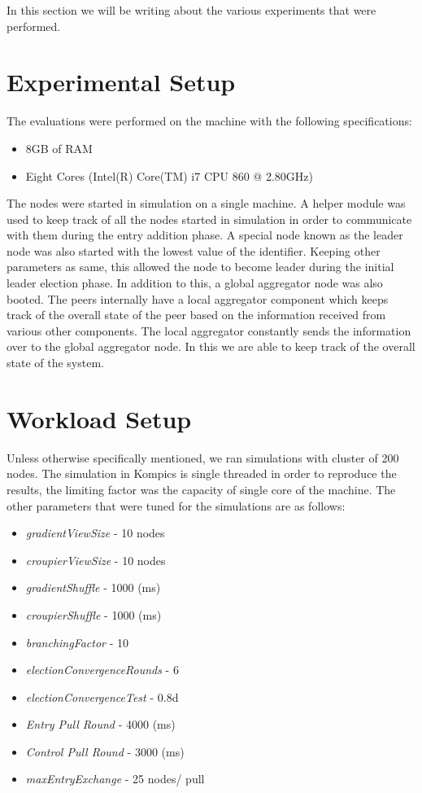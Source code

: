 \documentclass[12pt,a4paper,twoside,openright]{book}
\begin{document}
In this section we will be writing about the various experiments that were performed.

\section{Experimental Setup}

The evaluations were performed on the machine with the following specifications:

\begin{itemize}

\item 8GB of RAM
\item Eight Cores (Intel(R) Core(TM) i7 CPU 860  @ 2.80GHz)
\end{itemize}

The nodes were started in simulation on a single machine. A helper module was used to keep track of all the nodes started in simulation in order to communicate with them during the entry addition phase. A special node known as the leader node was also started with the lowest value of the identifier. Keeping other parameters as same, this allowed the node to become leader during the initial leader election phase. In addition to this, a global aggregator node was also booted. The peers internally have a local aggregator component which keeps track of the overall state of the peer based on the information received from various other components. The local aggregator constantly sends the information over to the global aggregator node. In this we are able to keep track of the overall state of the system.



\section{Workload Setup}

Unless otherwise specifically mentioned, we ran simulations with cluster of 200 nodes. The simulation in Kompics is single threaded in order to reproduce the results, the limiting factor was the capacity of single core of the machine. The other parameters that were tuned for the simulations are as follows:

\begin{itemize}
\setlength\itemsep{0em}
\item \textit{gradientViewSize} - 10 nodes
\item \textit{croupierViewSize} - 10 nodes
\item \textit{gradientShuffle} - 1000 (ms)
\item \textit{croupierShuffle} - 1000 (ms)
\item \textit{branchingFactor} - 10
\item \textit{electionConvergenceRounds} - 6
\item \textit{electionConvergenceTest} - 0.8d
\item \textit{Entry Pull Round} - 4000 (ms)
\item \textit{Control Pull Round} - 3000 (ms)
\item \textit{maxEntryExchange} - 25 nodes/ pull
\end{itemize}
\end{document}
